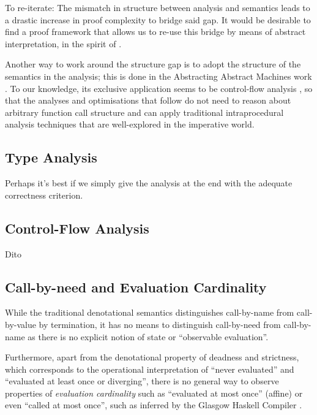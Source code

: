 To re-iterate: The mismatch in structure between analysis and semantics leads to
a drastic increase in proof complexity to bridge said gap. It would be desirable
to find a proof framework that allows us to re-use this bridge by means of
abstract interpretation, in the spirit of \citet{Cousot:21}.

Another way to work around the structure gap is to adopt the structure of the
semantics in the analysis; this is done in the Abstracting Abstract
Machines work \citep{aam}. To our knowledge, its exclusive application seems
to be control-flow analysis \citep{Shivers:91}, so that the analyses and
optimisations that follow do not need to reason about arbitrary function call
structure and can apply traditional intraprocedural analysis techniques that are
well-explored in the imperative world. 

\subsection{Type Analysis}

Perhaps it's best if we simply give the analysis at the end with the adequate
correctness criterion.

\subsection{Control-Flow Analysis}

Dito

\subsection{Call-by-need and Evaluation Cardinality}

While the traditional denotational semantics distinguishes call-by-name from
call-by-value by termination, it has no means to distinguish call-by-need from
call-by-name as there is no explicit notion of state or ``observable evaluation''.

Furthermore, apart from the denotational property of deadness and strictness,
which corresponds to the operational interpretation of ``never evaluated'' and
``evaluated at least once or diverging'', there is no general way to observe
properties of \emph{evaluation cardinality} such as ``evaluated at most once''
(affine) or even ``called at most once'', such as inferred by the Glasgow
Haskell Compiler \citep{cardinality}.

